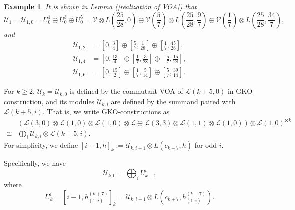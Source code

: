 \documentclass{article}
\newtheorem{example}[lemma]{Example}
\begin{document}
\begin{example}
It is shown in Lemma (\ref{realization of VOA}) that 
$$\mathcal{U}_1=\mathcal{U}_{1,0}= U_0^1\oplus U_0^3\oplus U_0^5
=\mathcal{V}\otimes L(\frac{25}{28},0)\oplus\mathcal{V}(\frac{5}{7})\otimes L(\frac{25}{28},\frac{9}{7})\oplus \mathcal{V}(\frac{1}{7})\otimes L(\frac{25}{28},\frac{34}{7}),$$
and
$$
\begin{aligned}
\mathcal{U}_{1,2}&=\left[0,\frac{3}{4}\right]\oplus\left[\frac{5}{7},\frac{1}{28}\right]\oplus\left[\frac{1}{7},\frac{45}{28}\right],\\
\mathcal{U}_{1,4}&=\left[0,\frac{13}{4}\right]\oplus\left[\frac{1}{7},\frac{3}{28}\right]\oplus\left[\frac{5}{7},\frac{15}{28}\right],\\
\mathcal{U}_{1,6}&=\left[0,\frac{15}{2}\right]\oplus\left[\frac{1}{7},\frac{5}{14}\right]\oplus\left[\frac{5}{7},\frac{39}{14}\right].
\end{aligned}
$$
\end{example}

For $k\geq 2$, $\mathcal{U}_{k}=\mathcal{U}_{k,0}$ is defined by
the commutant VOA of $\mathcal{L}(k+5,0)$ in GKO-construction,
and its modules $\mathcal{U}_{k,i}$ are defined by the summand paired with $\mathcal{L}(k+5,i)$.
That is, we write GKO-constructions as
$$\begin{aligned}
&\left(\mathcal{L}\left(3,0\right)\otimes\mathcal{L}\left(1,0\right)\otimes\mathcal{L}\left(1,0\right)\otimes\mathcal{L}\oplus\mathcal{L}\left(3,3\right)\otimes\mathcal{L}\left(1,1\right)\otimes\mathcal{L}\left(1,0\right)\right)\otimes\mathcal{L}(1,0)^{\otimes k}\\
\cong&\bigoplus_{i}\mathcal{U}_{k,i}\otimes \mathcal{L}(k+5,i).
\end{aligned}
$$
For simplicity, we define 
$\left[i-1,h\right]_k:=
\mathcal{U}_{k,i-1}\otimes L\left(c_{k+7},h\right)$ for odd $i$.

Specifically, we have
$$\mathcal{U}_{k,0}=\bigoplus_{i} U_{k-1}^{i}$$
where
$$U_k^{i}=\left[i-1,h_{(1,i)}^{(k+7)}\right]_k=
\mathcal{U}_{k,i-1}\otimes L\left(c_{k+7},h_{(1,i)}^{(k+7)}\right).$$
\end{document}
